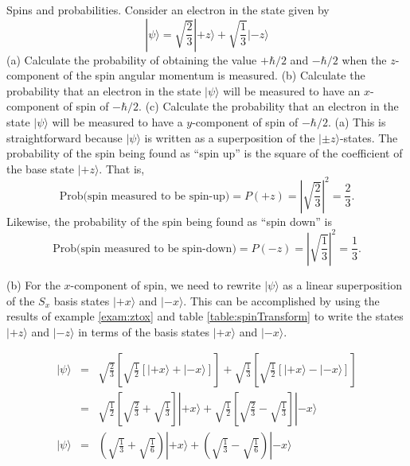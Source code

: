 \begin{example}{Spins and probabilities.} 
\label{example:spinsProbabilities}
Consider an electron in the state given by
\begin{equation}
|\psi\rangle = \sqrt{\frac{2}{3}}|\mbox{$+z$}\rangle +
 \sqrt{\frac{1}{3}}|\mbox{$-z$}\rangle
\label{eq:ex3}
\end{equation}
(a) Calculate the probability of obtaining the value $+\hbar/2$ and $-\hbar/2$ when
the $z$-component of the spin angular momentum is measured.  (b) Calculate the probability that an electron in the state $|\psi\rangle$
will be measured to have an $x$-component of spin of $-\hbar/2$.  (c)
Calculate the probability that an electron in the state $|\psi\rangle$
will be measured to have a $y$-component of spin of $-\hbar/2$.
\solution
(a) This is straightforward because $|\psi\rangle$ is written
as a superposition of the $|\mbox{$\pm z$}\rangle$-states. The probability of
the spin being found as ``spin up'' is the square of the
coefficient of the base state $|\mbox{$+z$}\rangle$. That is,
\begin{equation}
\mbox{Prob}\bigl(\mbox{spin measured to be spin-up}\bigr) = P(+z) = 
\left|\sqrt{\frac{2}{3}}\right|^2 = \frac{2}{3}. \nonumber
\end{equation}
\noindent Likewise, the probability of the spin being found as ``spin down'' is 
\begin{equation}
\mbox{Prob}\bigl(\mbox{spin measured to be spin-down}\bigr) = P(-z) = 
\left|\sqrt{\frac{1}{3}}\right|^2 = \frac{1}{3}.\nonumber
\end{equation}

(b) For the $x$-component of spin, we need to rewrite $|\mbox{$\psi$}\rangle$ as a linear superposition of the $S_x$ basis states $|\mbox{$+x$}\rangle$ and $|\mbox{$-x$}\rangle$. This can be accomplished by using the results of example \ref{exam:ztox} and table \ref{table:spinTransform} to write the states $|\mbox{$+z$}\rangle$ and $|\mbox{$-z$}\rangle$ in terms of the basis states $|\mbox{$+x$}\rangle$ and $|\mbox{$-x$}\rangle$.

\begin{eqnarray}
|\mbox{$\psi$}\rangle & = & \sqrt{\frac{2}{3}} \left[ \sqrt{\frac{1}{2}} \left[ |\mbox{$+x$}\rangle + |\mbox{$-x$}\rangle \right] \right] + \sqrt{\frac{1}{3}} \left[ \sqrt{\frac{1}{2}} \left[ |\mbox{$+x$}\rangle - |\mbox{$-x$}\rangle \right] \right] \nonumber\\
 & = & \sqrt{\frac{1}{2}} \left[ \sqrt{\frac{2}{3}} + \sqrt{\frac{1}{3}} \right] |\mbox{$+x$}\rangle + \sqrt{\frac{1}{2}} \left[ \sqrt{\frac{2}{3}} - \sqrt{\frac{1}{3}} \right] |\mbox{$-x$}\rangle \nonumber\\
|\mbox{$\psi$}\rangle & = & \left( \sqrt{\frac{1}{3}} + \sqrt{\frac{1}{6}}\right)|\mbox{$+x$}\rangle +  \left( \sqrt{\frac{1}{3}} - \sqrt{\frac{1}{6}}\right)|\mbox{$-x$}\rangle 
\end{eqnarray}


\end{example}

